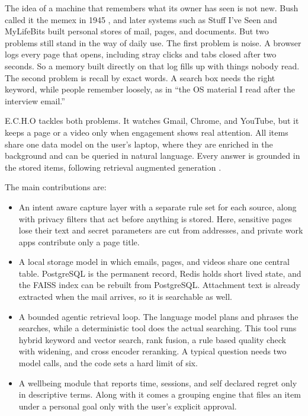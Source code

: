 \documentclass[conference]{IEEEtran}
\begin{document}
The idea of a machine that remembers what its owner has seen is not new. Bush called it the memex in 1945 \cite{b1}, and later systems such as Stuff I've Seen \cite{b2} and MyLifeBits \cite{b3} built personal stores of mail, pages, and documents. But two problems still stand in the way of daily use. The first problem is noise. A browser logs every page that opens, including stray clicks and tabs closed after two seconds. So a memory built directly on that log fills up with things nobody read. The second problem is recall by exact words. A search box needs the right keyword, while people remember loosely, as in ``the OS material I read after the interview email.''

E.C.H.O tackles both problems. It watches Gmail, Chrome, and YouTube, but it keeps a page or a video only when engagement shows real attention. All items share one data model on the user's laptop, where they are enriched in the background and can be queried in natural language. Every answer is grounded in the stored items, following retrieval augmented generation \cite{b4}.

The main contributions are:
\begin{itemize}
\item An intent aware capture layer with a separate rule set for each source, along with privacy filters that act before anything is stored. Here, sensitive pages lose their text and secret parameters are cut from addresses, and private work apps contribute only a page title.
\item A local storage model in which emails, pages, and videos share one central table. PostgreSQL is the permanent record, Redis holds short lived state, and the FAISS index can be rebuilt from PostgreSQL. Attachment text is already extracted when the mail arrives, so it is searchable as well.
\item A bounded agentic retrieval loop. The language model plans and phrases the searches, while a deterministic tool does the actual searching. This tool runs hybrid keyword and vector search, rank fusion, a rule based quality check with widening, and cross encoder reranking. A typical question needs two model calls, and the code sets a hard limit of six.
\item A wellbeing module that reports time, sessions, and self declared regret only in descriptive terms. Along with it comes a grouping engine that files an item under a personal goal only with the user's explicit approval.
\end{itemize}
\end{document}

